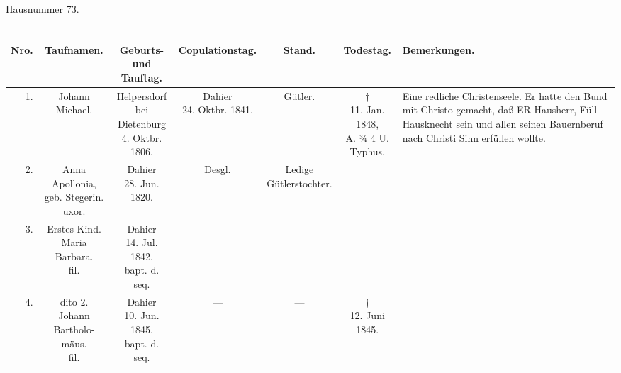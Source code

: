 \clearpage
{}
\begin{sideways}
\begin{minipage}{0.92\textheight}
\begin{center}
Hausnummer 73.\\[0.3em]
{\large {}}\\[0.6em]
\footnotesize
\begin{tabular}{|r|c|c|c|c|c|p{3.6cm}|}
\hline
Nro. & Taufnamen. & \zl{Geburts- und\\ Tauftag.} & Copulationstag. & Stand. & Todestag. & \centering Bemerkungen. \tabularnewline \hline\hline
1. & Johann Michael. & \zl{Helpersdorf bei\\ Dietenburg\\ 4. Oktbr. 1806.} & \zl{Dahier\\ 24. Oktbr. 1841.} & Gütler. & \zl{†\\ 11. Jan. 1848,\\ A. ¾ 4 U.\\ Typhus.} & \scriptsize Eine redliche Christenseele. Er hatte den Bund mit Christo gemacht, daß ER Hausherr, Füll Hausknecht sein und allen seinen Bauernberuf nach Christi Sinn erfüllen wollte. \\ \hline
2. & \zl{Anna Apollonia,\\ geb. Stegerin.\\ uxor.} & \zl{Dahier\\ 28. Jun. 1820.} & Desgl. & \zl{Ledige\\ Gütlerstochter.} & & \\ \hline
3. & \zl{Erstes Kind.\\ Maria Barbara.\\ fil.} & \zl{Dahier\\ 14. Jul. 1842.\\ bapt. d. seq.} & & & & \\ \hline
4. & \zl{dito 2.\\ Johann Bartholo-\\ mäus.\\ fil.} & \zl{Dahier\\ 10. Jun. 1845.\\ bapt. d. seq.} & — & — & \zl{†\\ 12. Juni 1845.} & \\ \hline
\end{tabular}
\end{center}
\end{minipage}
\end{sideways}

